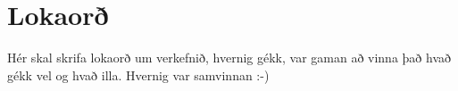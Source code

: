 \section{Lokaorð}
Hér skal skrifa lokaorð um verkefnið, hvernig gékk, var gaman að vinna það hvað gékk vel og hvað illa. Hvernig var samvinnan :-) \cite{brock}
